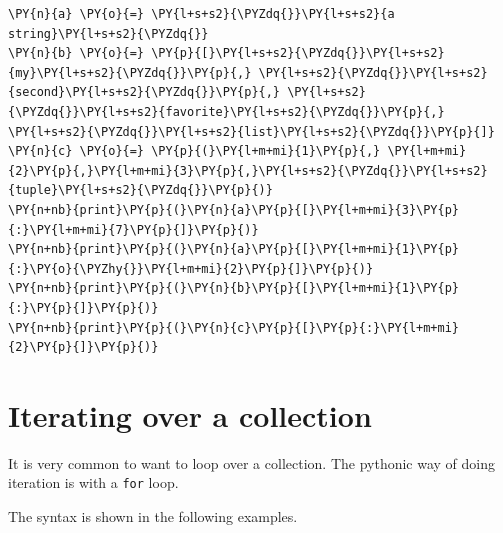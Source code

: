 \begin{Verbatim}[commandchars=\\\{\}]
\PY{n}{a} \PY{o}{=} \PY{l+s+s2}{\PYZdq{}}\PY{l+s+s2}{a string}\PY{l+s+s2}{\PYZdq{}}
\PY{n}{b} \PY{o}{=} \PY{p}{[}\PY{l+s+s2}{\PYZdq{}}\PY{l+s+s2}{my}\PY{l+s+s2}{\PYZdq{}}\PY{p}{,} \PY{l+s+s2}{\PYZdq{}}\PY{l+s+s2}{second}\PY{l+s+s2}{\PYZdq{}}\PY{p}{,} \PY{l+s+s2}{\PYZdq{}}\PY{l+s+s2}{favorite}\PY{l+s+s2}{\PYZdq{}}\PY{p}{,} \PY{l+s+s2}{\PYZdq{}}\PY{l+s+s2}{list}\PY{l+s+s2}{\PYZdq{}}\PY{p}{]}
\PY{n}{c} \PY{o}{=} \PY{p}{(}\PY{l+m+mi}{1}\PY{p}{,} \PY{l+m+mi}{2}\PY{p}{,}\PY{l+m+mi}{3}\PY{p}{,}\PY{l+s+s2}{\PYZdq{}}\PY{l+s+s2}{tuple}\PY{l+s+s2}{\PYZdq{}}\PY{p}{)}
\PY{n+nb}{print}\PY{p}{(}\PY{n}{a}\PY{p}{[}\PY{l+m+mi}{3}\PY{p}{:}\PY{l+m+mi}{7}\PY{p}{]}\PY{p}{)}
\PY{n+nb}{print}\PY{p}{(}\PY{n}{a}\PY{p}{[}\PY{l+m+mi}{1}\PY{p}{:}\PY{o}{\PYZhy{}}\PY{l+m+mi}{2}\PY{p}{]}\PY{p}{)}
\PY{n+nb}{print}\PY{p}{(}\PY{n}{b}\PY{p}{[}\PY{l+m+mi}{1}\PY{p}{:}\PY{p}{]}\PY{p}{)}
\PY{n+nb}{print}\PY{p}{(}\PY{n}{c}\PY{p}{[}\PY{p}{:}\PY{l+m+mi}{2}\PY{p}{]}\PY{p}{)}
\end{Verbatim}


\section{Iterating over a collection}


It is very common to want to loop over a collection.
The pythonic way of doing iteration is with a \texttt{for} loop.


The syntax is shown in the following examples.

